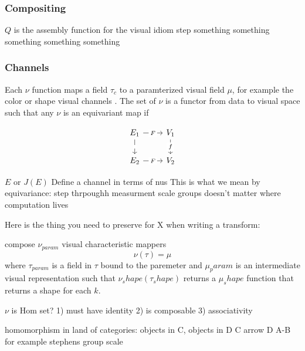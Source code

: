 \documentclass[../main.tex]{subfiles}
\begin{document}
\subsubsection{Compositing}

$Q$ is the assembly function for the visual idiom step something something something something something 

\subsubsection{Channels}

Each $\nu$ function maps a field $\tau_c$ to a paramterized visual field $\mu$, for example the color or shape visual channels \cite{bertinIIPropertiesGraphic2011,munznerMarksChannels}. The set of $\nu$ is a functor from data to visual space such that any $\nu$ is an equivariant map if 

\begin{equation}
    \begin{tikzcd}
        E_1 \arrow[r, "F" description] \arrow[d, "" description] & V_1 \arrow[d, "f" description] \\
        E_2 \arrow[r, "F" description]                            & V_2                           
    \end{tikzcd}
\end{equation}

$E$ or $J(E)$
Define a channel in terms of nus
This is what we mean by equivariance: 
step thrpoughh measurment scale groups
doesn't matter where computation lives

Here is the thing you need to preserve for {X} when writing a transform:


compose $\nu_{param}$ visual characteristic mappers
\begin{equation}
    \nu(\tau) = \mu
\end{equation}
where $\tau_{param}$ is a field in $\tau$ bound to the paremeter and $\mu_param$ is an intermediate visual representation such that $\nu_shape(\tau_shape)$ returns a $\mu_shape$ function that returns a shape for each $k$.


$\nu$ is Hom set? 
1) must have identity
2) is composable
3) associativity 

homomorphism in land of categories:
objects in C, objects in D
C arrow D
 A-B for example stephens group scale
\end{document}
